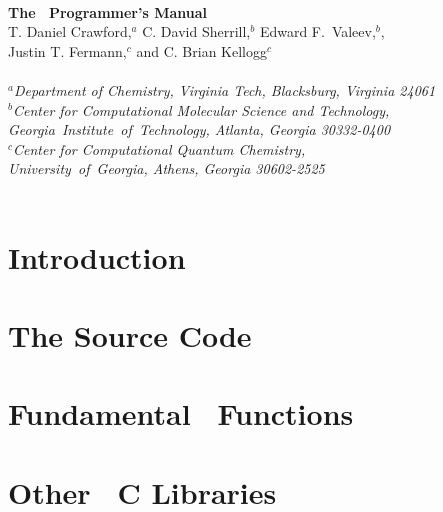 \documentclass[12pt]{article}
\begin{document}


\initfuncdesc

\begin{center}
\ \\
\vspace{2.0in}
{\bf {\Large The \PSIthree\ Programmer's Manual}} \\
\vspace{0.5in} 
T. Daniel Crawford,$^a$ C. David Sherrill,$^b$ Edward F.\ Valeev,$^b$, \\
Justin T. Fermann,$^c$ and C. Brian Kellogg$^c$ \\ 
\ \\ 
{\em $^a$Department of Chemistry, Virginia Tech, Blacksburg, Virginia 24061} \\
\vspace{0.1in}
{\em $^b$Center for Computational Molecular Science and Technology, \mbox{Georgia 
Institute of Technology,} Atlanta, Georgia 30332-0400} \\
\vspace{0.1in}
{\em $^c$Center for Computational Quantum Chemistry, \\ 
\mbox{University of Georgia,} Athens, Georgia 30602-2525} \\
\ \\
\vspace{0.3in}
\date{Version of: \today}
\end{center}

\thispagestyle{empty}

\newpage
\tableofcontents

\newpage
\section{Introduction}



\section{The \PSIthree Source Code}\label{cvs}


\section{Fundamental \PSIthree\ Functions}\label{Fundamental_PSI}


\section{Other \PSIthree\ C Libraries}\label{Other_Libs}

\end{document}
